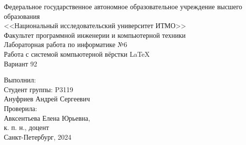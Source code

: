 
\large
\text{ }
\begin{center}
\vspace{1cm}
    Федеральное государственное автономное образовательное учреждение высшего образования\\
    <<Национальный исследовательский университет ИТМО>>\\
    \vspace{0.8cm}
    Факультет программной инженерии и компьютерной техники\\
    \vspace{2cm}
    Лабораторная работа по информатике №6\\
    \vspace{0.5cm}
    Работа с системой компьютерной вёрстки \LaTeX\\
    \vspace{0.5cm}
    Вариант 92\\
    \vspace{3cm}
    \end{center}
    \flushleft
    \hspace{10cm}     
    Выполнил:\\
    \vspace{0.3cm}
    \hspace{10cm} Студент группы: P3119\\
    \vspace{0.3cm}
    \hspace{10cm} Ануфриев Андрей Сергеевич\\
    \vspace{0.3cm}
    \hspace{10cm} Проверила:\\
    \vspace{0.3cm}
    \hspace{10cm} Авксентьева Елена Юрьевна,\\
    \vspace{0.3cm}
    \hspace{10cm} к. п. н., доцент\\
    \center
    \vspace{8cm}
    Санкт-Петербург, 2024    
